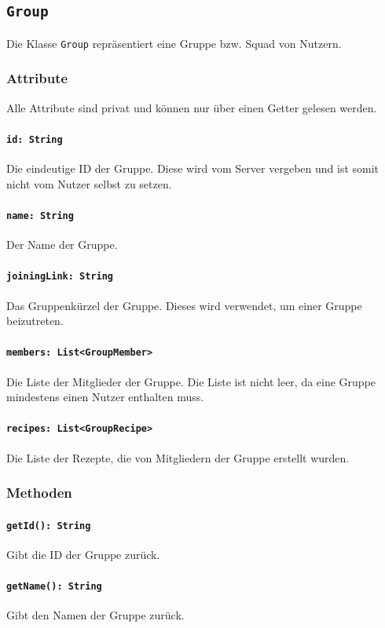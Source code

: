 \documentclass[parskip=full]{scrartcl}
\begin{document}
\subsection{\texttt{Group}}
Die Klasse \texttt{Group} repräsentiert eine Gruppe bzw. Squad von Nutzern.
\subsubsection*{Attribute}
Alle Attribute sind privat und können nur über einen Getter gelesen werden.
\paragraph{\texttt{id: String}}
Die eindeutige ID der Gruppe. Diese wird vom Server vergeben und ist somit nicht vom Nutzer selbst zu setzen.
\paragraph{\texttt{name: String}}
Der Name der Gruppe.
\paragraph{\texttt{joiningLink: String}}
Das Gruppenkürzel der Gruppe. Dieses wird verwendet, um einer Gruppe beizutreten.
\paragraph{\texttt{members: List<GroupMember>}}
Die Liste der Mitglieder der Gruppe. Die Liste ist nicht leer, da eine Gruppe mindestens einen Nutzer enthalten muss.
\paragraph{\texttt{recipes: List<GroupRecipe>}}
Die Liste der Rezepte, die von Mitgliedern der Gruppe erstellt wurden.

\subsubsection*{Methoden}
\paragraph{\texttt{getId(): String}}
Gibt die ID der Gruppe zurück.
\paragraph{\texttt{getName(): String}}
Gibt den Namen der Gruppe zurück.
\end{document}
